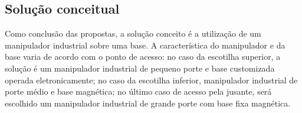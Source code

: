 \subsection{Solução conceitual}
Como conclusão das propostas, a solução conceito é a utilização de um
manipulador industrial sobre uma base. A característica do manipulador e da base
varia de acordo com o ponto de acesso: no caso
da escotilha superior, a solução é um manipulador industrial de pequeno porte e
base customizada operada eletronicamente; no caso da escotilha inferior,
manipulador industrial de porte médio e base magnética; no último caso de acesso
pela jusante, será escolhido um manipulador industrial de grande porte com base
fixa magnética.